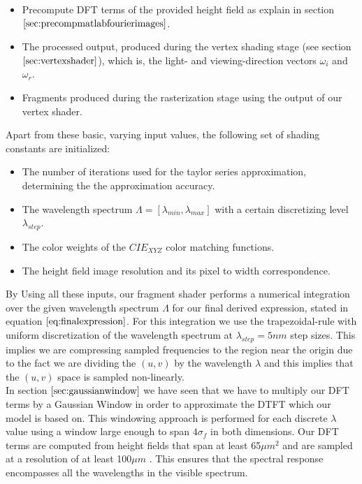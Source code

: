 \begin{itemize}
  \item Precompute DFT terms of the provided height field as explain in section $\ref{sec:precompmatlabfourierimages}$.
  \item The processed output, produced during the vertex shading stage (see section $\ref{sec:vertexshader}$), which is, the light- and viewing-direction vectors $\omega_i$ and $\omega_r$.
  \item Fragments produced during the rasterization stage using the output of our vertex shader.
\end{itemize}

Apart from these basic, varying input values, the following set of shading constants are initialized:

\begin{itemize}
  \item The number of iterations used for the taylor series approximation, determining the the approximation accuracy.
  \item The wavelength spectrum $\Lambda = [\lambda_{min}, \lambda_{max}]$ with a certain discretizing level $\lambda_{step}$.
  \item The color weights of the $CIE_{XYZ}$ color matching functions.
  \item The height field image resolution and its pixel to width correspondence.
\end{itemize}

By Using all these inputs, our fragment shader performs a numerical integration over the given wavelength spectrum $\Lambda$ for our final derived expression, stated in equation $\ref{eq:finalexpression}$. For this integration we use the trapezoidal-rule with uniform discretization of the wavelength spectrum at $\lambda_{step}=5nm$ step sizes. This implies we are compressing sampled frequencies to the region near the origin due to the fact we are dividing the $(u,v)$ by the wavelength $\lambda$ and this implies that the $(u,v)$ space is sampled non-linearly. \\

In section $\ref{sec:gaussianwindow}$ we have seen that we have to multiply our DFT terms by a Gaussian Window in order to approximate the DTFT which our model is based on. This windowing approach is performed for each discrete $\lambda$ value using a window large enough to span $4\sigma_f$ in both dimensions. Our DFT terms are computed from height fields that span at least 65$\mu m^2$ and are sampled at a resolution of at least 100$\mu m$ . 
This ensures that the spectral response encompasses all the wavelengths in the visible spectrum. \\


